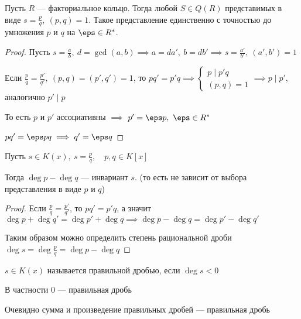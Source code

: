 \begin{theorem-non}
    Пусть $R$ --- факториальное кольцо. Тогда любой $S \in Q(R)$ представимых в виде $s = \frac{p}{q},~(p, q) = 1$. Такое представление единственно с точностью до умножения $p$ и $q$ на $\eps \in R^*$.
\end{theorem-non}

\begin{proof}
    
    Пусть $s = \frac{a}{b},~ d = \gcd(a, b) \implies a = d a',~ b = d b' \implies s = \frac{a'}{b'},~ (a', b') = 1$

    Если $\frac{p}{q} = \frac{p'}{q'},~ (p, q) = (p', q') = 1$, то $pq' = p'q \implies \begin{cases}
        p \mid p'q\\
        (p, q) = 1
    \end{cases} \implies p \mid p'$, аналогично $p' \mid p$

    То есть $p$ и $p'$ ассоциативны $\implies$ $p' = \eps p,~ \eps \in R^*$

    $pq' = \eps p q \implies q' = \eps q$
\end{proof}

\begin{lemma}
    Пусть $s \in K(x),~s = \frac{p}{q},\quad p, q \in K[x]$

    Тогда $\deg p - \deg q$ --- инвариант $s$. (то есть не зависит от выбора представления в виде $p$ и $q$)
\end{lemma}

\begin{proof}
    
    Если $\frac{p}{q} = \frac{p'}{q'}$, то $pq' = p'q$, а значит $\deg p + \deg q' = \deg p' + \deg q \implies \deg p - \deg q = \deg p' - \deg q'$

    Таким образом можно определить степень рациональной дроби $\deg s = \deg \frac{p}{q} = \deg p - \deg q$
\end{proof}

\begin{defn}
    $s \in K(x)$ называется правильной дробью, если $\deg s < 0$

    В частности $0$ --- правильная дробь
\end{defn}

\begin{notice}
    Очевидно сумма и произведение правильных дробей --- правильная дробь
\end{notice}

